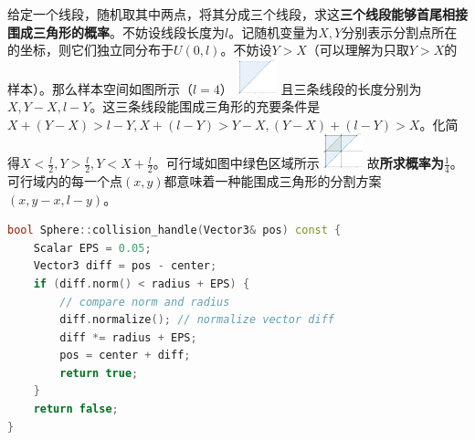 \documentclass[]{article}
\begin{document}
\begin{multicols}{3}
给定一个线段，随机取其中两点，将其分成三个线段，求这\textbf{三个线段能够首尾相接围成三角形的概率}。不妨设线段长度为$l$。记随机变量为$X,Y$分别表示分割点所在的坐标，则它们独立同分布于$U(0,l)$。不妨设$Y > X$（可以理解为只取$Y>X$的样本）。那么样本空间如图所示（$l=4$）
\includegraphics[height=10mm]{./img/1.png}
且三条线段的长度分别为$X,Y-X, l-Y$。这三条线段能围成三角形的充要条件是$X + (Y-X) > l -Y, X + (l - Y) > Y - X, (Y - X) + (l - Y) > X$。化简得$X < \frac{l}{2}, Y > \frac{l}{2}, Y < X + \frac{l}{2}$。可行域如图中绿色区域所示
\includegraphics[height=10mm]{./img/2.png}
故\textbf{所求概率为$\frac{1}{4}$}。可行域内的每一个点$(x,y)$都意味着一种能围成三角形的分割方案$(x,y-x,l-y)$。

\begin{lstlisting}[language=c++]
bool Sphere::collision_handle(Vector3& pos) const {
    Scalar EPS = 0.05;
    Vector3 diff = pos - center;
    if (diff.norm() < radius + EPS) {
        // compare norm and radius
        diff.normalize(); // normalize vector diff
        diff *= radius + EPS;
        pos = center + diff;
        return true;
    }
    return false;
}
\end{lstlisting}



\end{multicols}
\end{document}
